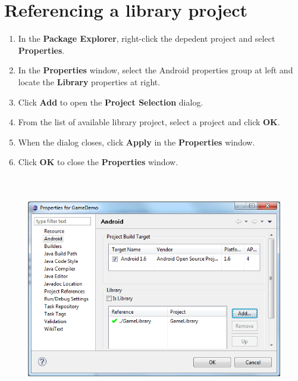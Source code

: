 \newpage
\section{Referencing a library project}
\begin{enumerate}

	\item \small In the \textbf{Package Explorer}, right-click the depedent project and select \textbf{Properties}.

	\item \small In the \textbf{Properties} window, select the Android properties group at left and locate the \textbf{Library} properties at right.
	
	\item \small Click \textbf{Add} to open the \textbf{Project Selection} dialog.

	\item \small From the list of available library project, select a project and click \textbf{OK}.

	\item \small When the dialog closes, click \textbf{Apply} in the \textbf{Properties} window.

	\item \small Click \textbf{OK} to close the \textbf{Properties} window.
	
\end{enumerate}

\newpage
		\begin{figure}[!htbp]
			\centering
				\includegraphics[height=10cm]{Resources/referencing_a_library_project.png}
		\end{figure}


